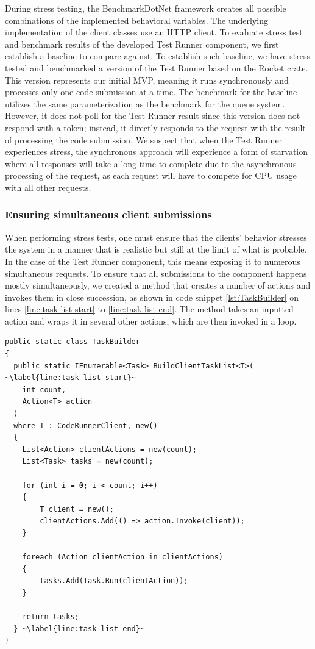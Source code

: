 During stress testing, the BenchmarkDotNet framework creates all possible combinations of the implemented behavioral variables.
The underlying implementation of the client classes use an HTTP client.
To evaluate stress test and benchmark results of the developed Test Runner component, we first establish a baseline to compare against.
To establish such baseline, we have stress tested and benchmarked a version of the Test Runner based on the Rocket crate.
This version represents our initial MVP, meaning it runs synchronously and processes only one code submission at a time.
The benchmark for the baseline utilizes the same parameterization as the benchmark for the queue system.
However, it does not poll for the Test Runner result since this version does not respond with a token; instead, it directly responds to the request with the result of processing the code submission.
We suspect that when the Test Runner experiences stress, the synchronous approach will experience a form of starvation where all responses will take a long time to complete due to the asynchronous processing of the request, as each request will have to compete for CPU usage with all other requests.

\subsubsection{Ensuring simultaneous client submissions}
When performing stress tests, one must ensure that the clients' behavior stresses the system in a manner that is realistic but still at the limit of what is probable.
In the case of the Test Runner component, this means exposing it to numerous simultaneous requests.
To ensure that all submissions to the component happens mostly simultaneously, we created a method that creates a number of actions and invokes them in close succession, as shown in code snippet \ref{lst:TaskBuilder} on lines \ref{line:task-list-start} to \ref{line:task-list-end}.
The method takes an inputted action and wraps it in several other actions, which are then invoked in a loop.

\begin{lstlisting}[language=CSharp, escapechar=~, caption={C\# code showing the \texttt{BuildClientTaskList} method, which is used to build a number of actions which are executed simultaneously in a Task}, label={lst:TaskBuilder}]
public static class TaskBuilder
{
  public static IEnumerable<Task> BuildClientTaskList<T>( ~\label{line:task-list-start}~
    int count,
    Action<T> action
  )
  where T : CodeRunnerClient, new()
  {
    List<Action> clientActions = new(count);
    List<Task> tasks = new(count);

    for (int i = 0; i < count; i++)
    {
        T client = new();
        clientActions.Add(() => action.Invoke(client));
    }

    foreach (Action clientAction in clientActions)
    {
        tasks.Add(Task.Run(clientAction));
    }

    return tasks;
  } ~\label{line:task-list-end}~
}
\end{lstlisting}

